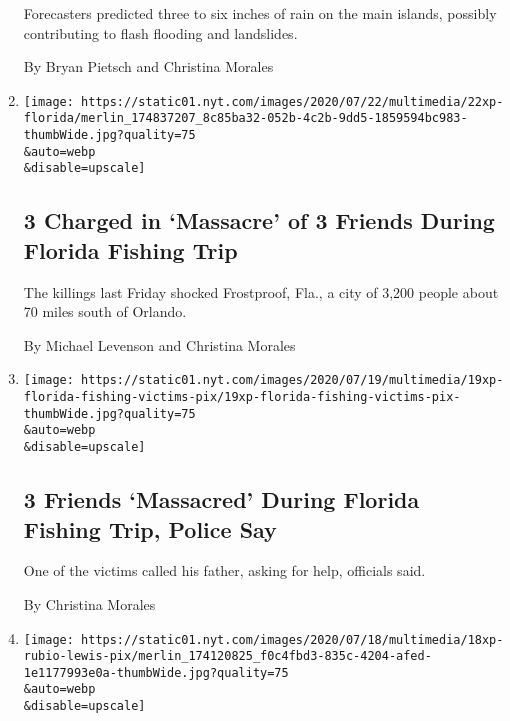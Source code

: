 \begin{enumerate}
  Forecasters predicted three to six inches of rain on the main islands,
  possibly contributing to flash flooding and landslides.

  By Bryan Pietsch and Christina Morales
\item
  \href{/2020/07/22/us/florida-fishing-murders-arrest.html}{}

  \texttt{[image: https://static01.nyt.com/images/2020/07/22/multimedia/22xp-florida/merlin\_174837207\_8c85ba32-052b-4c2b-9dd5-1859594bc983-thumbWide.jpg?quality=75\\\&auto=webp\\\&disable=upscale]}

  \hypertarget{3-charged-in-massacre-of-3-friends-during-florida-fishing-trip}{%
  \subsection{3 Charged in `Massacre' of 3 Friends During Florida
  Fishing
  Trip}\label{3-charged-in-massacre-of-3-friends-during-florida-fishing-trip}}

  The killings last Friday shocked Frostproof, Fla., a city of 3,200
  people about 70 miles south of Orlando.

  By Michael Levenson and Christina Morales
\item
  \href{/2020/07/20/us/polk-county-florida-fishing-deaths.html}{}

  \texttt{[image: https://static01.nyt.com/images/2020/07/19/multimedia/19xp-florida-fishing-victims-pix/19xp-florida-fishing-victims-pix-thumbWide.jpg?quality=75\\\&auto=webp\\\&disable=upscale]}

  \hypertarget{3-friends-massacred-during-florida-fishing-trip-police-say}{%
  \subsection{3 Friends `Massacred' During Florida Fishing Trip, Police
  Say}\label{3-friends-massacred-during-florida-fishing-trip-police-say}}

  One of the victims called his father, asking for help, officials said.

  By Christina Morales
\item
  \href{/2020/07/18/us/marco-rubio-elijah-cummings-john-lewis.html}{}

  \texttt{[image: https://static01.nyt.com/images/2020/07/18/multimedia/18xp-rubio-lewis-pix/merlin\_174120825\_f0c4fbd3-835c-4204-afed-1e1177993e0a-thumbWide.jpg?quality=75\\\&auto=webp\\\&disable=upscale]}

  \hypertarget{2-republican-senators-post-photos-of-elijah-cummings-in-john-lewis-tributes}{%
}
\end{enumerate}
